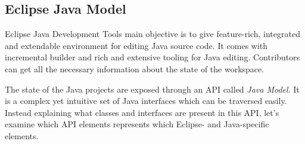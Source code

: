 \subsection{Eclipse Java Model}
Eclipse Java Development Tools main objective is to give feature-rich,
integrated and extendable environment for editing Java source code. It comes
with incremental builder and rich and extensive tooling for Java editing.
Contributors can get all the necessary information about the state of the
workspace.

The state of the Java projects are exposed through an API called \emph{Java
Model}. It is a complex yet intuitive set of Java interfaces which can be
traversed easily. Instead explaining what classes and interfaces are present in
this API, let's examine which API elements represents which Eclipse- and
Java-specific elements.
